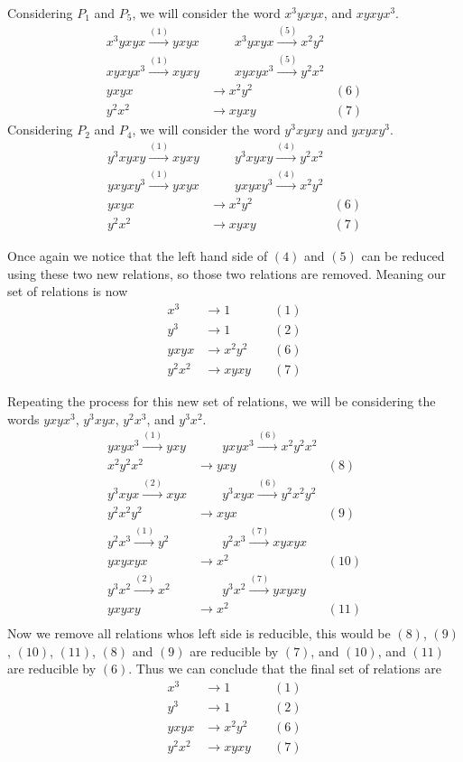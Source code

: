 \documentclass[10pt]{amsart}
\theoremstyle{definition}
\theoremstyle{remark}
\begin{document}
Considering $P_1$ and $P_5$, we will consider the word $x^3yxyx$, and $xyxyx^3$.
\begin{align*}
  x^3yxyx\xrightarrow{(1)}yxyx&\quad\quad
  x^3yxyx\xrightarrow{(5)}x^2y^2\\
  xyxyx^3\xrightarrow{(1)}xyxy&\quad\quad
  xyxyx^3\xrightarrow{(5)}y^2x^2\\
  yxyx&\rightarrow x^2y^2\quad&(6)\\
  y^2x^2&\rightarrow xyxy\quad&(7)
\end{align*}
Considering $P_2$ and $P_4$, we will consider the word $y^3xyxy$ and $yxyxy^3$.
\begin{align*}
  y^3xyxy\xrightarrow{(1)}xyxy&\quad\quad
  y^3xyxy\xrightarrow{(4)}y^2x^2\\
  yxyxy^3\xrightarrow{(1)}yxyx&\quad\quad
  yxyxy^3\xrightarrow{(4)}x^2y^2\\
  yxyx&\rightarrow x^2y^2\quad&(6)\\
  y^2x^2&\rightarrow xyxy\quad&(7)
\end{align*}

Once again we notice that the left hand side of $(4)$ and $(5)$ can be reduced
using these two new relations, so those two relations are removed. Meaning our
set of relations is now
\begin{align*}
  x^3&\rightarrow1\quad&(1)\\
  y^3&\rightarrow1\quad&(2)\\
  yxyx&\rightarrow x^2y^2\quad&(6)\\
  y^2x^2&\rightarrow xyxy\quad&(7)
\end{align*}

Repeating the process for this new set of relations, we will be considering the
words $yxyx^3$, $y^3xyx$, $y^2x^3$, and $y^3x^2$.
\begin{align*}
  yxyx^3\xrightarrow{(1)}yxy&\quad\quad
  yxyx^3\xrightarrow{(6)}x^2y^2x^2\\
  x^2y^2x^2&\rightarrow yxy\quad&(8)\\
  y^3xyx\xrightarrow{(2)}xyx&\quad\quad
  y^3xyx\xrightarrow{(6)}y^2x^2y^2\\
  y^2x^2y^2&\rightarrow xyx\quad&(9)\\
  y^2x^3\xrightarrow{(1)}y^2&\quad\quad
  y^2x^3\xrightarrow{(7)} xyxyx\\
  yxyxyx&\rightarrow x^2\quad&(10)\\
  y^3x^2\xrightarrow{(2)}x^2&\quad\quad
  y^3x^2\xrightarrow{(7)}yxyxy\\
  yxyxy&\rightarrow x^2\quad&(11)\\
\end{align*}
Now we remove all relations whos left side is reducible, this would be $(8)$,
$(9)$, $(10)$, $(11)$, $(8)$ and $(9)$ are reducible by $(7)$, and $(10)$, and
$(11)$ are reducible by $(6)$. Thus we can conclude that the final set of
relations are
\begin{align*}
  x^3&\rightarrow1\quad&(1)\\
  y^3&\rightarrow1\quad&(2)\\
  yxyx&\rightarrow x^2y^2\quad&(6)\\
  y^2x^2&\rightarrow xyxy\quad&(7)
\end{align*}
\end{document}
